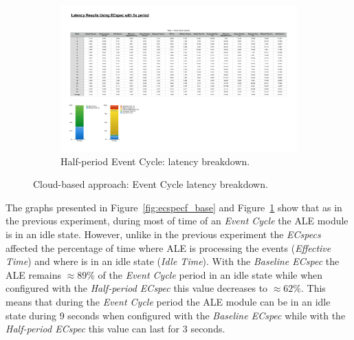 \begin{figure}[ht!]
\begin{subfigure}{.5\textwidth}
    \includegraphics[height=\linewidth]{./images/cloud_ecspecf_breakdown}
    \caption{Half-period Event Cycle: latency breakdown.}
    \label{fig:ecspecf_half}
  \end{subfigure}
  \caption[Cloud-based approach: event latency breakdown.]{Cloud-based approach: Event Cycle latency breakdown.}
  \label{fig:ecspecf_breakdown}
\end{figure}

The graphs presented in Figure~\ref{fig:ecspecf_base} and Figure~\ref{fig:ecspecf_half} show that
as in the previous experiment, during most of time of an \textit{Event Cycle} the \gls{ALE} module is
in an idle state. However, unlike in the previous experiment the \textit{ECspecs} affected the percentage of time
where \gls{ALE} is processing the events (\textit{Effective Time}) and where is in an idle state (\textit{Idle Time}).
With the \textit{Baseline ECspec} the \gls{ALE} remains $\approx89\%$ of the \textit{Event Cycle} period
in an idle state while when configured with the \textit{Half-period ECspec} this value decreases to
$\approx62\%$. This means that during the \textit{Event Cycle} period the \gls{ALE} module can be in
an idle state during 9 seconds when configured with the \textit{Baseline ECspec} while with the
\textit{Half-period ECspec} this value can last for 3 seconds.\\

